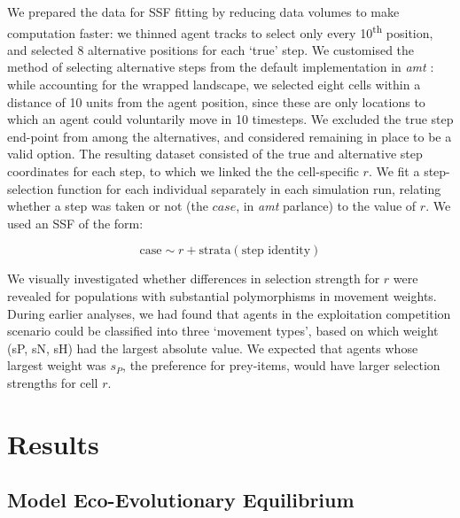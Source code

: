 We prepared the data for SSF fitting by reducing data volumes to make computation faster: we thinned agent tracks to select only every 10\textsuperscript{th} position, and selected 8 alternative positions for each `true' step.
We customised the method of selecting alternative steps from the default implementation in \textit{amt} \citep{signer2019}: while accounting for the wrapped landscape, we selected eight cells within a distance of 10 units from the agent position, since these are only locations to which an agent could voluntarily move in 10 timesteps.
We excluded the true step end-point from among the alternatives, and considered remaining in place to be a valid option.
The resulting dataset consisted of the true and alternative step coordinates for each step, to which we linked the the cell-specific $r$.
We fit a step-selection function for each individual separately in each simulation run, relating whether a step was taken or not (the $case$, in \textit{amt} parlance) to the value of $r$.
We used an SSF of the form:
\begin{linenomath*}
    \begin{equation}
        \text{case} \sim r + \text{strata}(\text{step~identity})
    \end{equation}
\end{linenomath*}
We visually investigated whether differences in selection strength for $r$ were revealed for populations with substantial polymorphisms in movement weights.
During earlier analyses, we had found that agents in the exploitation competition scenario could be classified into three `movement types', based on which weight (sP, sN, sH) had the largest absolute value.
We expected that agents whose largest weight was $s_P$, the preference for prey-items, would have larger selection strengths for cell $r$.

\section*{Results}

\subsection*{Model Eco-Evolutionary Equilibrium}

